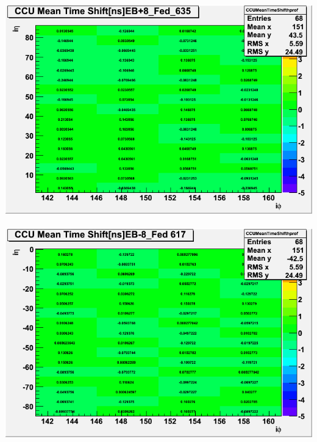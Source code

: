 \begin{center}\label{TimeLaser}
\centering
\mbox{\includegraphics[scale=0.2]{THESISPLOTS/CCU_Mean_Time_ShiftEB_Plus8_Fed_635.png} \quad
\includegraphics[scale=0.2]{THESISPLOTS/CCU-Mean-Time-Shift-EBMinus8-Fed617.png}}


\end{center}
